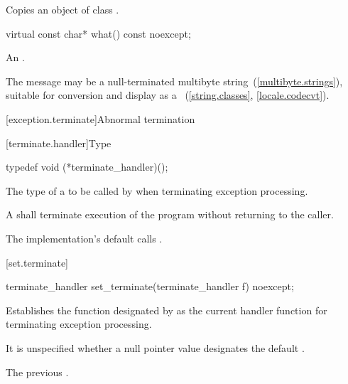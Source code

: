 \begin{itemdescr}
\pnum
\effects
Copies an object of class
.
\end{itemdescr}

%
\begin{itemdecl}
virtual const char* what() const noexcept;
\end{itemdecl}

\begin{itemdescr}
\pnum
\returns
An  \ntbs.%

\pnum
\remarks
The message may be a null-terminated multibyte string~(\ref{multibyte.strings}),
suitable for conversion and display as a
~(\ref{string.classes}, \ref{locale.codecvt}).
\end{itemdescr}

[exception.terminate]{Abnormal termination}

[terminate.handler]{Type }

%
\begin{itemdecl}
typedef void (*terminate_handler)();
\end{itemdecl}

\begin{itemdescr}
\pnum
The type of a
to be called by
%
when terminating exception processing.

\pnum
\required
A  shall
terminate execution of the program without returning to the caller.

\pnum
{}
The implementation's default  calls
.%
\end{itemdescr}

[set.terminate]{}

%
\begin{itemdecl}
terminate_handler set_terminate(terminate_handler f) noexcept;
\end{itemdecl}

\begin{itemdescr}
\pnum
\effects
Establishes the function designated by  as the current
handler function for terminating exception processing.

\pnum
\remarks It is unspecified whether a null pointer value designates the default
.

\pnum
\returns
The previous .
\end{itemdescr}

